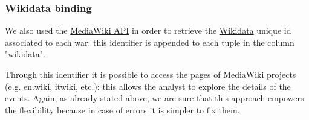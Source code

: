 \subsubsection{Wikidata binding}
We also used the \href{https://www.mediawiki.org/wiki/API:Main_page}{MediaWiki API} in order to retrieve the \href{https://wikidata.org}{Wikidata} unique id associated to each war: this identifier is appended to each tuple in the column "wikidata".

Through this identifier it is possible to access the pages of MediaWiki projects (e.g. en.wiki, itwiki, etc.): this allows the analyst to explore the details of the events. Again, as already stated above, we are sure that this approach empowers the flexibility because in case of errors it is simpler to fix them.
